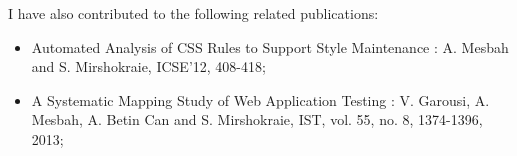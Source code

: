 I have also contributed to the following related publications:
\begin{itemize}
\item Automated Analysis of CSS Rules to Support Style Maintenance \cite{mesbah:icse12}: 
A. Mesbah and S. Mirshokraie, ICSE'12, 408-418;
\item A Systematic Mapping Study of Web Application Testing \cite{garousi:ist13}: 
V. Garousi, A. Mesbah, A. Betin Can and S. Mirshokraie, IST, vol. 55, no. 8, 1374-1396, 2013;
\end{itemize}
